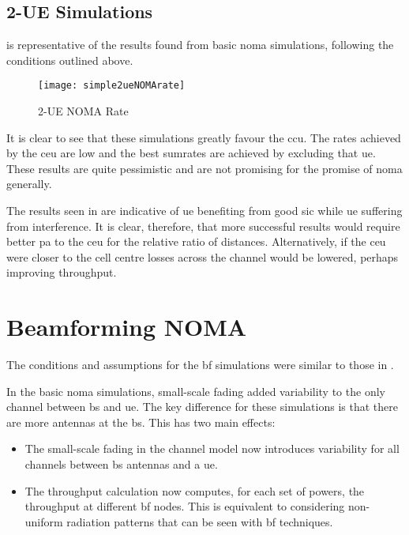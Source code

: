 \subsection{2-UE Simulations}
\label{sec:s2ue}

\par
{} is representative of the results found from basic \ac{noma} simulations, following the conditions outlined above.

\begin{figure}[htb]
	\centering
	\texttt{[image: simple2ueNOMArate]}
	\caption{2-UE NOMA Rate}
	\label{fig:s2ueRate}
\end{figure}

\par
It is clear to see that these simulations greatly favour the \ac{ccu}.
The rates achieved by the \ac{ceu} are low and the best sumrates are achieved by excluding that \ac{ue}.
These results are quite pessimistic and are not promising for the promise of \ac{noma} generally.

\par
The results seen in  are indicative of \ac{ue} benefiting from good \ac{sic} while \ac{ue} suffering from interference.
It is clear, therefore, that more successful results would require better \ac{pa} to the \ac{ceu} for the relative ratio of distances.
Alternatively, if the \ac{ceu} were closer to the cell centre losses across the channel would be lowered, perhaps improving throughput.

\section{Beamforming NOMA}
\label{sec:bfsim}
The conditions and assumptions for the \ac{bf} simulations were similar to those in .

\par
In the basic \ac{noma} simulations, small-scale fading added variability to the only channel between \ac{bs} and \ac{ue}.
The key difference for these simulations is that there are more antennas at the \ac{bs}.
This has two main effects:

\begin{itemize}
	\item
		The small-scale fading in the channel model now introduces variability for all channels between \ac{bs} antennas and a \ac{ue}.
	\item
		The throughput calculation now computes, for each set of powers, the throughput at different \acl{bf} nodes.
		This is equivalent to considering non-uniform radiation patterns that can be seen with \acl{bf} techniques.
\end{itemize}

